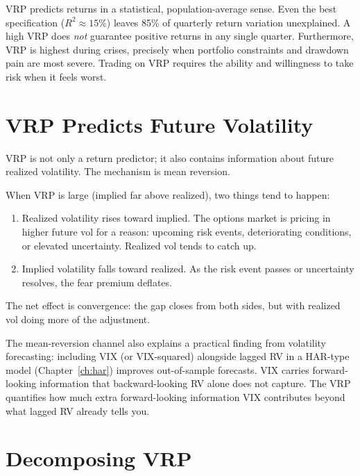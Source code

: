 \begin{warning}
VRP predicts returns in a statistical, population-average sense.
Even the best specification ($R^2 \approx 15\%$) leaves 85\% of quarterly return variation unexplained.
A high VRP does \emph{not} guarantee positive returns in any single quarter.
Furthermore, VRP is highest during crises, precisely when portfolio constraints and drawdown pain are most severe.
Trading on VRP requires the ability and willingness to take risk when it feels worst.
\end{warning}


\section{VRP Predicts Future Volatility}
\label{sec:vrp-vol-forecasting}

VRP is not only a return predictor; it also contains information about future realized volatility.
The mechanism is mean reversion.

When VRP is large (implied far above realized), two things tend to happen:
\begin{enumerate}[nosep]
  \item Realized volatility rises toward implied. The options market is pricing in higher future vol for a reason: upcoming risk events, deteriorating conditions, or elevated uncertainty. Realized vol tends to catch up.
  \item Implied volatility falls toward realized. As the risk event passes or uncertainty resolves, the fear premium deflates.
\end{enumerate}

The net effect is convergence: the gap closes from both sides, but with realized vol doing more of the adjustment.

The mean-reversion channel also explains a practical finding from volatility forecasting: including VIX (or VIX-squared) alongside lagged RV in a HAR-type model (Chapter~\ref{ch:har}) improves out-of-sample forecasts.
VIX carries forward-looking information that backward-looking RV alone does not capture.
The VRP quantifies how much extra forward-looking information VIX contributes beyond what lagged RV already tells you.


\section{Decomposing VRP}
\label{sec:vrp-decomposition}

